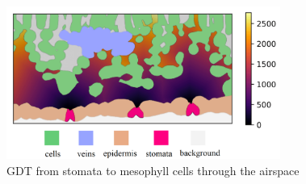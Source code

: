 \begin{figure}[ht]
    \centering
    \includegraphics[width=0.8\textwidth]{figures/dt_color.pdf}
    \caption{GDT from stomata to mesophyll cells through the airspace}
    \label{fig:gdt}
\end{figure}

